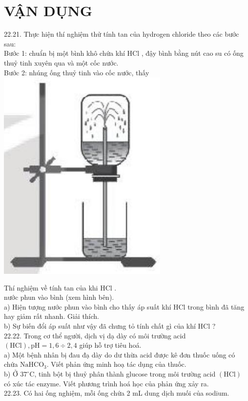 \documentclass[10pt]{article}
\begin{document}
\section*{VẬN DỤNG}
22.21. Thực hiện thí nghiệm thử tính tan của hydrogen chloride theo các bước sau:\\
Bước 1: chuẩn bị một bình khô chứa khí HCl , đậy bình bằng nút cao su có ống thuỷ tinh xuyên qua và một cốc nước.\\
Bước 2: nhúng ống thuỷ tinh vào cốc nước, thấy\\
\includegraphics[max width=\textwidth, center]{2025_10_23_daab5c8457c85b365b9eg-67}

Thí nghiệm về tính tan của khi HCl .\\
nước phun vào bình (xem hình bên).\\
a) Hiện tượng nước phun vào bình cho thấy áp suất khí HCl trong bình đã tăng hay giảm rất nhanh. Giải thích.\\
b) Sự biến đổi áp suất như vậy đã chưng tỏ tính chất gì của khí HCl ?\\
22.22. Trong cơ thể người, dịch vị dạ dày có môi trường acid $(\mathrm{HCl}), \mathrm{pH}=1,6 \div 2,4$ giúp hỗ trợ tiêu hoá.\\
a) Một bệnh nhân bị đau đạ dày do dư thừa acid được kê đơn thuốc uống có chứa $\mathrm{NaHCO}_{3}$. Viết phản ứng minh hoạ tác dụng của thuốc.\\
b) Ở $37^{\circ} \mathrm{C}$, tinh bột bị thuỷ phân thành glucose trong môi trường acid $(\mathrm{HCl})$ có xúc tác enzyme. Viết phương trình hoá học của phản ứng xảy ra.\\
22.23. Có hai ống nghiệm, mỗi ống chứa 2 mL dung dịch muối của sodium.
\end{document}
